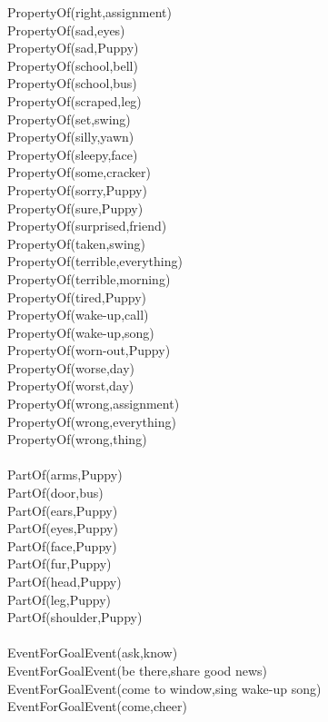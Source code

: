 \begin{multicols}{2}
\begin{footnotesize}
PropertyOf(right,assignment) \\
PropertyOf(sad,eyes) \\
PropertyOf(sad,Puppy) \\
PropertyOf(school,bell) \\
PropertyOf(school,bus) \\
PropertyOf(scraped,leg) \\
PropertyOf(set,swing) \\
PropertyOf(silly,yawn) \\
PropertyOf(sleepy,face) \\
PropertyOf(some,cracker) \\
PropertyOf(sorry,Puppy) \\
PropertyOf(sure,Puppy) \\
PropertyOf(surprised,friend) \\
PropertyOf(taken,swing) \\
PropertyOf(terrible,everything) \\
PropertyOf(terrible,morning) \\
PropertyOf(tired,Puppy) \\
PropertyOf(wake-up,call) \\
PropertyOf(wake-up,song) \\
PropertyOf(worn-out,Puppy) \\
PropertyOf(worse,day) \\
PropertyOf(worst,day) \\
PropertyOf(wrong,assignment) \\
PropertyOf(wrong,everything) \\
PropertyOf(wrong,thing) \\
~\\
PartOf(arms,Puppy) \\
PartOf(door,bus) \\
PartOf(ears,Puppy) \\
PartOf(eyes,Puppy) \\
PartOf(face,Puppy) \\
PartOf(fur,Puppy) \\
PartOf(head,Puppy) \\
PartOf(leg,Puppy) \\
PartOf(shoulder,Puppy) \\
~\\
EventForGoalEvent(ask,know) \\
EventForGoalEvent(be there,share good news) \\
EventForGoalEvent(come to window,sing wake-up song) \\
EventForGoalEvent(come,cheer) \\

\end{footnotesize}
\end{multicols}
